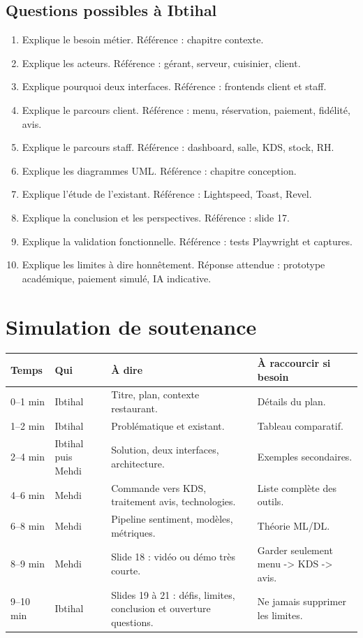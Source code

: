 \documentclass[11pt,a4paper]{article}
\begin{document}
\subsection*{Questions possibles à Ibtihal}
\begin{enumerate}
\item Explique le besoin métier. Référence : chapitre contexte.
\item Explique les acteurs. Référence : gérant, serveur, cuisinier, client.
\item Explique pourquoi deux interfaces. Référence : frontends client et staff.
\item Explique le parcours client. Référence : menu, réservation, paiement, fidélité, avis.
\item Explique le parcours staff. Référence : dashboard, salle, KDS, stock, RH.
\item Explique les diagrammes UML. Référence : chapitre conception.
\item Explique l'étude de l'existant. Référence : Lightspeed, Toast, Revel.
\item Explique la conclusion et les perspectives. Référence : slide 17.
\item Explique la validation fonctionnelle. Référence : tests Playwright et captures.
\item Explique les limites à dire honnêtement. Réponse attendue : prototype académique, paiement simulé, IA indicative.
\end{enumerate}

\section{Simulation de soutenance}

\begin{longtable}{p{2cm}p{2cm}p{6cm}p{5cm}}
\toprule
\textbf{Temps} & \textbf{Qui} & \textbf{À dire} & \textbf{À raccourcir si besoin}\\
\midrule
0--1 min & Ibtihal & Titre, plan, contexte restaurant. & Détails du plan.\\
1--2 min & Ibtihal & Problématique et existant. & Tableau comparatif.\\
2--4 min & Ibtihal puis Mehdi & Solution, deux interfaces, architecture. & Exemples secondaires.\\
4--6 min & Mehdi & Commande vers KDS, traitement avis, technologies. & Liste complète des outils.\\
6--8 min & Mehdi & Pipeline sentiment, modèles, métriques. & Théorie ML/DL.\\
8--9 min & Mehdi & Slide 18 : vidéo ou démo très courte. & Garder seulement menu -> KDS -> avis.\\
9--10 min & Ibtihal & Slides 19 à 21 : défis, limites, conclusion et ouverture questions. & Ne jamais supprimer les limites.\\
\bottomrule
\end{longtable}
\end{document}
